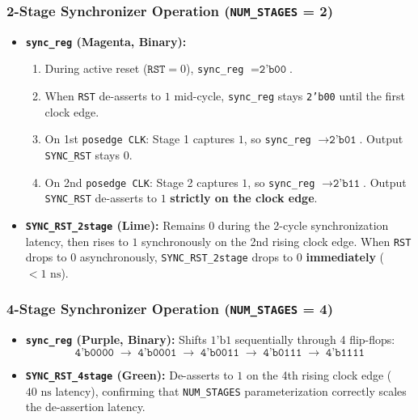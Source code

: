 \documentclass[12pt,a4paper]{article}
\begin{document}
\subsubsection{2-Stage Synchronizer Operation (\texttt{NUM\_STAGES} = 2)}
\begin{itemize}
    \item \textbf{\texttt{sync\_reg} (Magenta, Binary):}
    \begin{enumerate}
        \item During active reset ($\texttt{RST} = 0$), \texttt{sync\_reg} $= \texttt{2'b00}$.
        \item When \texttt{RST} de-asserts to $1$ mid-cycle, \texttt{sync\_reg} stays \texttt{2'b00} until the first clock edge.
        \item On 1st \texttt{posedge CLK}: Stage 1 captures $1$, so \texttt{sync\_reg} $\to \texttt{2'b01}$. Output \texttt{SYNC\_RST} stays $0$.
        \item On 2nd \texttt{posedge CLK}: Stage 2 captures $1$, so \texttt{sync\_reg} $\to \texttt{2'b11}$. Output \texttt{SYNC\_RST} de-asserts to $1$ \textbf{strictly on the clock edge}.
    \end{enumerate}
    \item \textbf{\texttt{SYNC\_RST\_2stage} (Lime):} Remains $0$ during the 2-cycle synchronization latency, then rises to $1$ synchronously on the 2nd rising clock edge. When \texttt{RST} drops to $0$ asynchronously, \texttt{SYNC\_RST\_2stage} drops to $0$ \textbf{immediately} ($< 1\text{ ns}$).
\end{itemize}

\subsubsection{4-Stage Synchronizer Operation (\texttt{NUM\_STAGES} = 4)}
\begin{itemize}
    \item \textbf{\texttt{sync\_reg} (Purple, Binary):} Shifts $1\text{'b1}$ sequentially through 4 flip-flops:
    \[
        \texttt{4'b0000} \;\to\; \texttt{4'b0001} \;\to\; \texttt{4'b0011} \;\to\; \texttt{4'b0111} \;\to\; \texttt{4'b1111}
    \]
    \item \textbf{\texttt{SYNC\_RST\_4stage} (Green):} De-asserts to $1$ on the 4th rising clock edge ($40\text{ ns}$ latency), confirming that \texttt{NUM\_STAGES} parameterization correctly scales the de-assertion latency.
\end{itemize}
\end{document}
